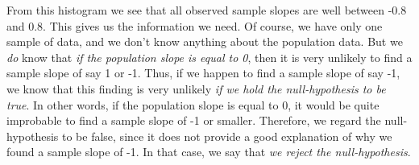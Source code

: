 \documentclass[]{book}\usepackage[]{graphicx}\usepackage[]{color}
\begin{document}
From this histogram we see that all observed sample slopes are well between -0.8 and 0.8. This gives us the information we need. Of course, we have only one sample of data, and we don't know anything about the population data. But we \textit{do} know that \textit{if the population slope is equal to 0}, then it is very unlikely to find a sample slope of say 1 or -1. Thus, if we happen to find a sample slope of say -1, we know that this finding is very unlikely \textit{if we hold the null-hypothesis to be true}. In other words, if the population slope is equal to 0, it would be quite improbable to find a sample slope of -1 or smaller. Therefore, we regard the null-hypothesis to be false, since it does not provide a good explanation of why we found a sample slope of -1. In that case, we say that \textit{we reject the null-hypothesis}.
\end{document}
